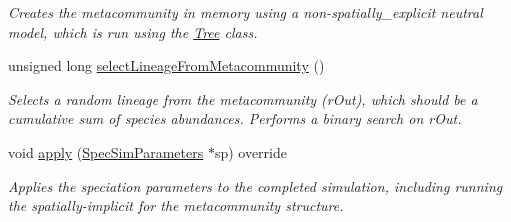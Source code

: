 \begin{DoxyCompactItemize}
\begin{DoxyCompactList}\small\item\em Creates the metacommunity in memory using a non-\/spatially\+\_\+explicit neutral model, which is run using the \hyperlink{class_tree}{Tree} class. \end{DoxyCompactList}\item 
unsigned long \hyperlink{class_metacommunity_ac1884bfd79b272d8dcb470f34f579cf1}{select\+Lineage\+From\+Metacommunity} ()
\begin{DoxyCompactList}\small\item\em Selects a random lineage from the metacommunity (r\+Out), which should be a cumulative sum of species abundances. Performs a binary search on r\+Out. \end{DoxyCompactList}\item 
void \hyperlink{class_metacommunity_adf30667aa617bc969706eab2facd5482}{apply} (\hyperlink{struct_spec_sim_parameters}{Spec\+Sim\+Parameters} $\ast$sp) override
\begin{DoxyCompactList}\small\item\em Applies the speciation parameters to the completed simulation, including running the spatially-\/implicit for the metacommunity structure. \end{DoxyCompactList}\end{DoxyCompactItemize}
